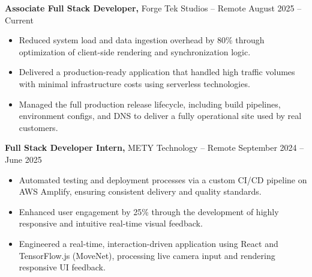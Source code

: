 \documentclass[11pt]{article}       %
\begin{document}
\textbf{Associate Full Stack Developer,} {Forge Tek Studios} -- Remote \hfill August 2025 -- Current 
\vspace{-9pt}
\begin{itemize}
  \item Reduced system load and data ingestion overhead by 80\% through optimization of client-side rendering and synchronization logic.
  \item Delivered a production-ready application that handled high traffic volumes with minimal infrastructure costs using serverless technologies.
  \item Managed the full production release lifecycle, including build pipelines, environment configs, and DNS to deliver a fully operational site used by real customers.
\end{itemize}

\textbf{Full Stack Developer Intern,} {METY Technology} -- Remote \hfill September 2024 -- June 2025 
\vspace{-9pt}
\begin{itemize}
  \item Automated testing and deployment processes via a custom CI/CD pipeline on AWS Amplify, ensuring consistent delivery and quality standards.
  \item Enhanced user engagement by 25\% through the development of highly responsive and intuitive real-time visual feedback.
  \item Engineered a real-time, interaction-driven application using React and TensorFlow.js (MoveNet), processing live camera input and rendering responsive UI feedback.
\end{itemize}

\end{document}
